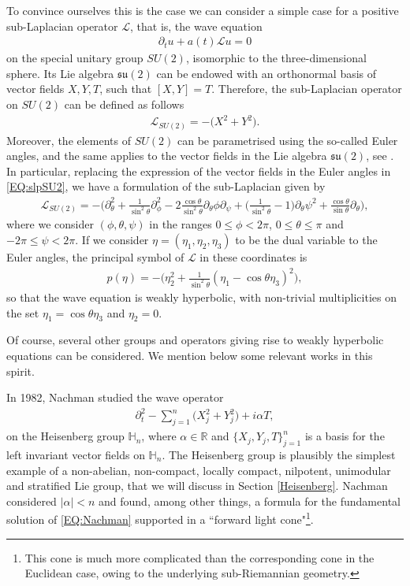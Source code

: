 \documentclass[12pt,oneside,a4paper]{book}
\numberwithin{equation}{section}     %
\theoremstyle{plain}
\theoremstyle{definition}
\newcommand{\R}{{\mathbb R}}
\newcommand{\slp}{{\mathcal L}}
\begin{document}
To convince ourselves this is the case we can consider a simple case for a positive sub-Laplacian operator $\slp$, that is, the wave equation
\begin{align*}
\partial_t u+a(t)\slp u=0
\end{align*}
on the special unitary group $SU(2)$, isomorphic to the three-dimensional sphere. Its Lie algebra $\mathfrak{su}(2)$ can be endowed with an orthonormal basis of vector fields ${X, Y, T }$, such that $[X, Y ] = T $. Therefore, the sub-Laplacian operator on $SU(2)$ can be defined as follows
\begin{align}\label{EQ:slpSU2}
\slp_{SU(2)} =-\big(X^2 +Y^2\big).
\end{align}
Moreover, the elements of $SU(2)$ can be parametrised using the so-called Euler angles, and the same applies to the vector fields in the Lie algebra $\mathfrak{su}(2)$, see \cite[Definition 11.3.1, Proposition 11.5.9]{RT2009}. In particular, replacing the expression of the vector fields in the Euler angles in \eqref{EQ:slpSU2}, we have a formulation of the sub-Laplacian given by
\begin{align*}
\slp_{SU(2)} =-\Big(\partial_{\theta}^2+\frac{1}{\sin^2\theta}\partial_\phi^2-2\frac{\cos\theta}{\sin^2\theta}\partial_{\theta}\phi\partial_\psi +\big(\frac{1}{\sin^2\theta}-1\big)\partial_{\theta}\psi^2+\frac{\cos\theta}{\sin\theta}\partial_\theta\Big),
\end{align*}
where we consider $(\phi,\theta,\psi)$ in the ranges $0 \leq \phi< 2\pi$, $0 \leq\theta\leq\pi$ and $-2\pi \leq \psi < 2\pi$. If we consider $\eta = (\eta_1,\eta_2,\eta_3)$ to be the dual variable to the Euler angles, the principal symbol of $\slp$ in these coordinates is
\begin{align*}
p(\eta)=-\Big(\eta_2^2+\frac{1}{\sin^2\theta}(\eta_1-\cos\theta \eta_3)^2\Big),
\end{align*}
so that the wave equation is weakly hyperbolic, with non-trivial multiplicities on the set $\eta_1 =\cos\theta\eta_3$ and $\eta_2 =0$.


Of course, several other groups and operators giving rise to weakly hyperbolic equations can be considered. We mention below some relevant works in this spirit.

In 1982, Nachman \cite{Nachman:wave-Heisenberg-CPDE-1982} studied the wave operator
\begin{align}\label{EQ:Nachman}
\partial_t^2-\sum_{j=1}^n \big(X_j^2+Y_j^2\big)+i\alpha T,
\end{align}
on the Heisenberg group $\mathbb{H}_n$, where $\alpha\in \R$ and $\{X_j,Y_j,T\}_{j=1}^n$ is a basis for the left invariant vector fields on $\mathbb{H}_n$. The Heisenberg group is plausibly the simplest example of a non-abelian, non-compact, locally compact, nilpotent, unimodular and stratified Lie group, that we will discuss in Section \ref{Heisenberg}. Nachman considered $|\alpha|<n$ and found, among other things, a formula for the fundamental solution of \eqref{EQ:Nachman} supported in a ``forward light cone"\footnote{This cone is much more complicated than the corresponding cone in the Euclidean case, owing to the underlying sub-Riemannian geometry.}.
\end{document}
